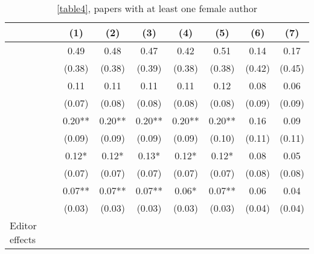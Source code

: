\begin{table}
    \footnotesize
    \centering
    \begin{threeparttable}
        \caption{\autoref{table4}, papers with at least one female author}
        \label{tableC4b}
        \begin{tabular}{p{2.64cm}S@{}S@{}S@{}S@{}S@{}S@{}S@{}}
            \toprule
            &{(1)}&{(2)}&{(3)}&{(4)}&{(5)}&{(6)}&{(7)}\\
            \midrule
            &        0.49   &        0.48   &        0.47   &        0.42   &        0.51   &        0.14   &        0.17   \\
                                          &      (0.38)   &      (0.38)   &      (0.39)   &      (0.38)   &      (0.38)   &      (0.42)   &      (0.45)   \\
                &        0.11   &        0.11   &        0.11   &        0.11   &        0.12   &        0.08   &        0.06   \\
                                          &      (0.07)   &      (0.08)   &      (0.08)   &      (0.08)   &      (0.08)   &      (0.09)   &      (0.09)   \\
                   &        0.20** &        0.20** &        0.20** &        0.20** &        0.20** &        0.16   &        0.09   \\
                                          &      (0.09)   &      (0.09)   &      (0.09)   &      (0.09)   &      (0.10)   &      (0.11)   &      (0.11)   \\
                          &        0.12*  &        0.12*  &        0.13*  &        0.12*  &        0.12*  &        0.08   &        0.05   \\
                                          &      (0.07)   &      (0.07)   &      (0.07)   &      (0.07)   &      (0.07)   &      (0.08)   &      (0.08)   \\
                    &        0.07** &        0.07** &        0.07** &        0.06*  &        0.07** &        0.06   &        0.04   \\
                                          &      (0.03)   &      (0.03)   &      (0.03)   &      (0.03)   &      (0.03)   &      (0.04)   &      (0.04)   \\
            \midrule
            Editor effects                &           {}   &           {}   &           {}   &           {}   &           {}   &           {}   &           {}   \\

\end{tabular}
\end{threeparttable}
\end{table}
